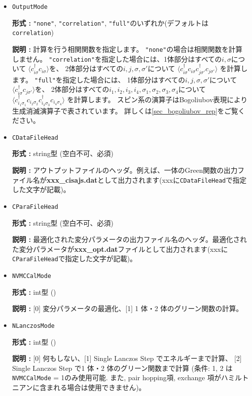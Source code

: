 \begin{itemize}

\item \verb|OutputMode|

  {\bf 形式 :} \verb|"none"|, \verb|"correlation"|, \verb|"full"|のいずれか(デフォルトは\verb|correlation|)

  {\bf 説明 :} 計算を行う相関関数を指定します。
\verb|"none"|の場合は相関関数を計算しません。
\verb|"correlation"|を指定した場合には、1体部分はすべての$i, \sigma$について
$\langle c_{i \sigma}^{\dagger}c_{i \sigma} \rangle$を、
2体部分はすべての$i, j, \sigma, \sigma'$について
$\langle c_{i \sigma}^{\dagger}c_{i \sigma} c_{j \sigma'}^{\dagger}c_{j \sigma'} \rangle$
を計算します。
\verb|"full"|を指定した場合には、
1体部分はすべての$i, j, \sigma, \sigma'$について
$\langle c_{i \sigma}^{\dagger}c_{j \sigma'} \rangle$を、
2体部分はすべての$i_1, i_2, i_3, i_4, \sigma_1, \sigma_2, \sigma_3, \sigma_4$について
$\langle c_{i_1 \sigma_1}^{\dagger}c_{i_2 \sigma_2} c_{i_3 \sigma_3}^{\dagger}c_{i_4 \sigma_4} \rangle$
を計算します。
スピン系の演算子はBogoliubov表現により生成消滅演算子で表されています。
詳しくは\ref{sec_bogoliubov_rep}をご覧ください。

  \item  \verb|CDataFileHead|

 {\bf 形式 :} string型 (空白不可、必須)

{\bf 説明 :} アウトプットファイルのヘッダ。例えば、一体のGreen関数の出力ファイル名が{\bf xxx\_cisajs.dat}として出力されます(xxxに\verb|CDataFileHead|で指定した文字が記載)。

 \item  \verb|CParaFileHead|

 {\bf 形式 :} string型 (空白不可、必須)

{\bf 説明 :} 最適化された変分パラメータの出力ファイル名のヘッダ。最適化された変分パラメータが{\bf xxx\_opt.dat}ファイルとして出力されます(xxxに\verb|CParaFileHead|で指定した文字が記載)。
 
 
 \item  \verb|NVMCCalMode|

 {\bf 形式 :} int型 ()

{\bf 説明 :} [0] 変分パラメータの最適化、[1] 1 体・2 体のグリーン関数の計算。
 
 \item  \verb|NLanczosMode|

 {\bf 形式 :} int型 ()

{\bf 説明 :} [0] 何もしない、[1] Single Lanczos Step でエネルギーまで計算、
[2] Single Lanczos Step で1 体・2 体のグリーン関数まで計算
(条件: 1, 2 は\verb|NVMCCalMode| = 1のみ使用可能. 
また, pair hopping項, exchange 項がハミルトニアンに含まれる場合は使用できません)。
 

\end{itemize}
